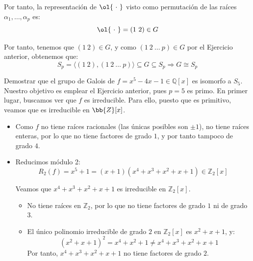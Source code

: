 \begin{ejercicio}
    Por tanto, la representación de $\ol{\ \cdot \ }$ visto como permutación de las raíces $\alpha_1,\ldots,\alpha_p$ es:
    \begin{equation*}
        \ol{\ \cdot \ } = (1\ 2) \in G
    \end{equation*}

    Por tanto, tenemos que $(1\ 2)\in G$, y como $(1\ 2\ \ldots\ p)\in G$ por el Ejercicio anterior, obtenemos que:
    \begin{equation*}
        S_p = \langle (1\ 2), (1\ 2\ \ldots\ p) \rangle \subseteq G \subseteq S_p \Longrightarrow G \cong S_p
    \end{equation*}
\end{ejercicio}

\begin{ejercicio} %
    Demostrar que el grupo de Galois de $f= x^5-4x-1\in \mathbb{Q}[x]$ es isomorfo a $S_5$.\\

    Nuestro objetivo es emplear el Ejercicio anterior, pues $p=5$ es primo. En primer lugar, buscamos ver que $f$ es irreducible. Para ello, puesto que es primitivo, veamos que es irreducible en $\bb{Z}[x]$.
    \begin{itemize}
        \item Como $f$ no tiene raíces racionales (las únicas posibles son $\pm 1$), no tiene raíces enteras, por lo que no tiene factores de grado $1$, y por tanto tampoco de grado $4$.
        \item Reducimos módulo 2:
        \begin{equation*}
            R_2(f) = x^5+1= (x+1)(x^4+x^3+x^2+x+1) \in \mathbb{Z}_2[x]
        \end{equation*}

        Veamos que $x^4+x^3+x^2+x+1$ es irreducible en $\mathbb{Z}_2[x]$.
        \begin{itemize}
            \item No tiene raíces en $\mathbb{Z}_2$, por lo que no tiene factores de grado $1$ ni de grado $3$.
            \item El único polinomio irreducible de grado $2$ en $\mathbb{Z}_2[x]$ es $x^2+x+1$, y:
            \begin{equation*}
                (x^2+x+1)^2 = x^4+x^2+1 \neq x^4+x^3+x^2+x+1
            \end{equation*}
            Por tanto, $x^4+x^3+x^2+x+1$ no tiene factores de grado $2$.
        \end{itemize}


\end{itemize}
\end{ejercicio}
